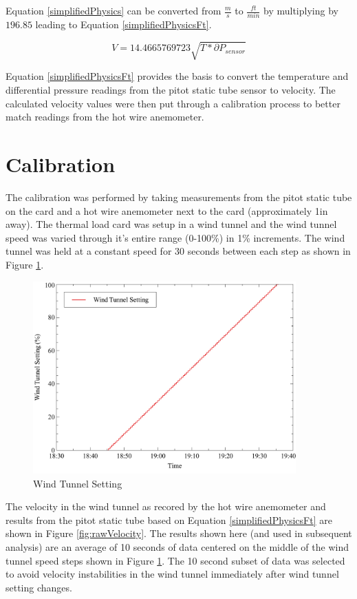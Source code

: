 \documentclass[]{article}
\begin{document}
\noindent
Equation \ref{simplifiedPhysics} can be converted from $\frac{m}{s}$ to $\frac{ft}{min}$ by multiplying by $196.85$ leading to Equation \ref{simplifiedPhysicsFt}.

\begin{equation}\label{simplifiedPhysicsFt}
V = 14.4665769723 \sqrt{ T * \partial P_{sensor} }
\end{equation}

\noindent
Equation \ref{simplifiedPhysicsFt} provides the basis to convert the temperature and differential pressure readings from the pitot static tube sensor to velocity.  The calculated velocity values were then put through a calibration process to better match readings from the hot wire anemometer.

\section{Calibration}

The calibration was performed by taking measurements from the pitot static tube on the card and a hot wire anemometer next to the card (approximately 1in away).  The thermal load card was setup in a wind tunnel and the wind tunnel speed was varied through it's entire range (0-100\%) in 1\% increments.  The wind tunnel was held at a constant speed for 30 seconds between each step as shown in Figure \ref{fig:tunnelSetting}.

\begin{figure}[H]
	\centering\includegraphics[width=0.9\textwidth]{cardCalibration_01}
	\caption{Wind Tunnel Setting}
	\label{fig:tunnelSetting}
\end{figure}

\noindent
The velocity in the wind tunnel as recored by the hot wire anemometer and results from the pitot static tube based on Equation \ref{simplifiedPhysicsFt} are shown in Figure \ref{fig:rawVelocity}.  The results shown here (and used in subsequent analysis) are an average of 10 seconds of data centered on the middle of the wind tunnel speed steps shown in Figure \ref{fig:tunnelSetting}.  The 10 second subset of data was selected to avoid velocity instabilities in the wind tunnel immediately after wind tunnel setting changes.
\end{document}
